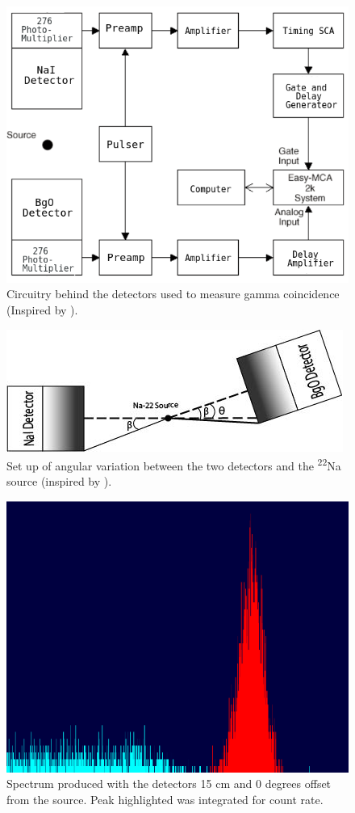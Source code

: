 \documentclass[../final_report_main.tex]{subfiles}
\begin{document}
\begin{figure}[H]
    \centering
    \includegraphics[width=.45\textwidth]{Figures/gamma_coin_circuitry.png}
    \caption{Circuitry behind the detectors used to measure gamma coincidence
    (Inspired by \cite{Experiment_Set_Up:1}).}
    \label{figure:circuitry}
\end{figure}
\begin{figure}[H]
     \centering
     \includegraphics[width=.45\textwidth]{Figures/detector_set_up.jpg}
     \caption{Set up of angular variation between the two detectors and the
     \textsuperscript{22}Na source (inspired by \cite{Experiment_Set_Up:2}).}
     \label{figure:set_up}
\end{figure}
\begin{figure}[H]
    \centering
    \includegraphics[width=0.9\linewidth]{Figures/sample_spectrum.png}
    \caption{Spectrum produced with the detectors 15 cm and 0 degrees offset
    from the source. Peak highlighted was integrated for count rate.}
    \label{figure:spectrum}
\end{figure}
\end{document}
